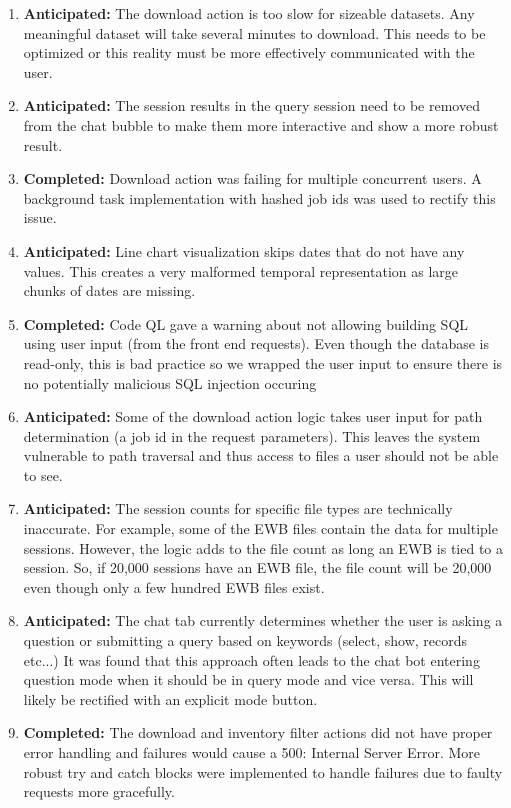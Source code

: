 \documentclass[12pt, titlepage]{article}
\begin{document}
\begin{enumerate}
  \item \textbf{Anticipated: }The download action is too slow for sizeable datasets. Any meaningful dataset will take several minutes to download. This needs to be optimized or
  this reality must be more effectively communicated with the user.
  \item \textbf{Anticipated: }The session results in the query session need to be removed from the chat bubble to make them more interactive and show a more robust result.
  \item \textbf{Completed: }Download action was failing for multiple concurrent users. A background task implementation with hashed job ids was used to
  rectify this issue.
  \item \textbf{Anticipated: }Line chart visualization skips dates that do not have any values. This creates a very malformed temporal representation as large
  chunks of dates are missing. 
  \item \textbf{Completed: }Code QL gave a warning about not allowing building SQL using user input (from the front end requests). Even though the database is read-only,
  this is bad practice so we wrapped the user input to ensure there is no potentially malicious SQL injection occuring
  \item \textbf{Anticipated: }Some of the download action logic takes user input for path determination (a job id in the request parameters). This leaves the system
  vulnerable to path traversal and thus access to files a user should not be able to see.
  \item \textbf{Anticipated: }The session counts for specific file types are technically inaccurate. For example, some of the EWB files contain the data for multiple
  sessions. However, the logic adds to the file count as long an EWB is tied to a session. So, if 20,000 sessions have an EWB file, the file count will be 20,000 even though
  only a few hundred EWB files exist.
  \item \textbf{Anticipated: }The chat tab currently determines whether the user is asking a question or submitting a query based on keywords (select, show, records etc...) It was
  found that this approach often leads to the chat bot entering question mode when it should be in query mode and vice versa. This will likely be rectified
  with an explicit mode button.
  \item \textbf{Completed: }The download and inventory filter actions did not have proper error handling and failures would cause a 500: Internal Server Error. More robust
  try and catch blocks were implemented to handle failures due to faulty requests more gracefully.
\end{enumerate}
\end{document}
